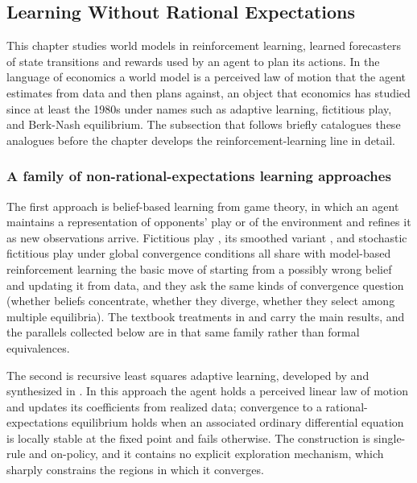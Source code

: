 \subsection{Learning Without Rational Expectations}
\label{section:fc_paradigms}

This chapter studies world models in reinforcement learning, learned forecasters of state transitions and rewards used by an agent to plan its actions. In the language of economics a world model is a perceived law of motion that the agent estimates from data and then plans against, an object that economics has studied since at least the 1980s under names such as adaptive learning, fictitious play, and Berk-Nash equilibrium. The subsection that follows briefly catalogues these analogues before the chapter develops the reinforcement-learning line in detail.

\subsubsection{A family of non-rational-expectations learning approaches}
\label{section:fc_paradigm_family}

The first approach is belief-based learning from game theory, in which an agent maintains a representation of opponents' play or of the environment and refines it as new observations arrive. Fictitious play \citep{Brown1951}, its smoothed variant \citep{FudenbergKreps1993}, and stochastic fictitious play under global convergence conditions \citep{HofbauerSandholm2002} all share with model-based reinforcement learning the basic move of starting from a possibly wrong belief and updating it from data, and they ask the same kinds of convergence question (whether beliefs concentrate, whether they diverge, whether they select among multiple equilibria). The textbook treatments in \citet{FudenbergLevine1998} and \citet{Young2004} carry the main results, and the parallels collected below are in that same family rather than formal equivalences.

The second is recursive least squares adaptive learning, developed by \citet{MarcetSargent1989} and synthesized in \citet{EvansHonkapohja2001}. In this approach the agent holds a perceived linear law of motion and updates its coefficients from realized data; convergence to a rational-expectations equilibrium holds when an associated ordinary differential equation is locally stable at the fixed point and fails otherwise. The construction is single-rule and on-policy, and it contains no explicit exploration mechanism, which sharply constrains the regions in which it converges.

